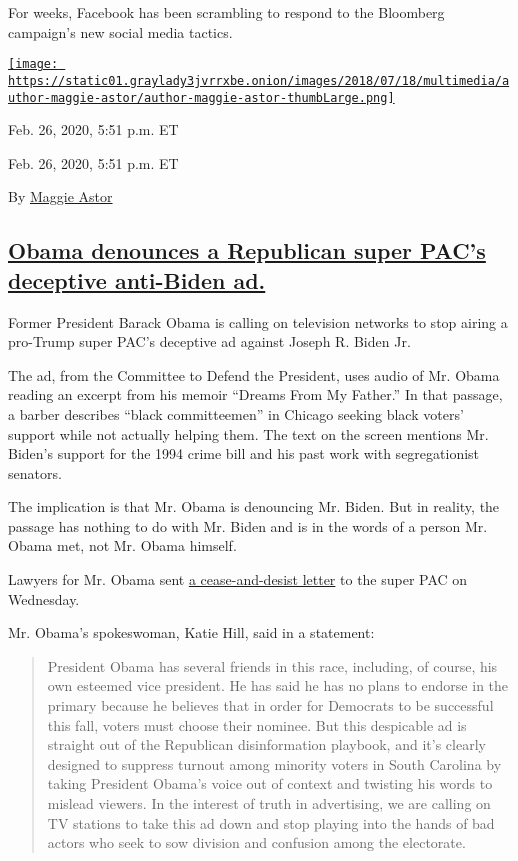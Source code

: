 For weeks, Facebook has been scrambling to respond to the Bloomberg
campaign's new social media tactics.

\href{https://www.nytimes3xbfgragh.onion/by/maggie-astor}{\texttt{[image: https://static01.graylady3jvrrxbe.onion/images/2018/07/18/multimedia/author-maggie-astor/author-maggie-astor-thumbLarge.png]}}

Feb. 26, 2020, 5:51 p.m. ET

Feb. 26, 2020, 5:51 p.m. ET

By \href{https://www.nytimes3xbfgragh.onion/by/maggie-astor}{Maggie
Astor}

\hypertarget{obama-denounces-a-republican-super-pacs-deceptive-anti-biden-ad}{%
\subsection{\texorpdfstring{\protect\hyperlink{obama-biden-ad}{Obama
denounces a Republican super PAC's deceptive anti-Biden
ad.}}{Obama denounces a Republican super PAC's deceptive anti-Biden ad.}}\label{obama-denounces-a-republican-super-pacs-deceptive-anti-biden-ad}}

Former President Barack Obama is calling on television networks to stop
airing a pro-Trump super PAC's deceptive ad against Joseph R. Biden Jr.

The ad, from the Committee to Defend the President, uses audio of Mr.
Obama reading an excerpt from his memoir ``Dreams From My Father.'' In
that passage, a barber describes ``black committeemen'' in Chicago
seeking black voters' support while not actually helping them. The text
on the screen mentions Mr. Biden's support for the 1994 crime bill and
his past work with segregationist senators.

The implication is that Mr. Obama is denouncing Mr. Biden. But in
reality, the passage has nothing to do with Mr. Biden and is in the
words of a person Mr. Obama met, not Mr. Obama himself.

Lawyers for Mr. Obama sent
\href{https://int.graylady3jvrrxbe.onion/data/documenthelper/6788-obama-letter-on-anti-biden-ad/7ec054e132c6eadffa88/optimized/full.pdf\#page=1}{a
cease-and-desist letter} to the super PAC on Wednesday.

Mr. Obama's spokeswoman, Katie Hill, said in a statement:

\begin{quote}
President Obama has several friends in this race, including, of course,
his own esteemed vice president. He has said he has no plans to endorse
in the primary because he believes that in order for Democrats to be
successful this fall, voters must choose their nominee. But this
despicable ad is straight out of the Republican disinformation playbook,
and it's clearly designed to suppress turnout among minority voters in
South Carolina by taking President Obama's voice out of context and
twisting his words to mislead viewers. In the interest of truth in
advertising, we are calling on TV stations to take this ad down and stop
playing into the hands of bad actors who seek to sow division and
confusion among the electorate.
\end{quote}

